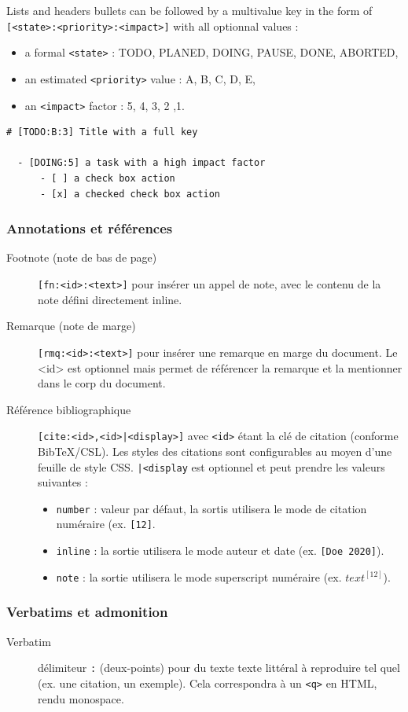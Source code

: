 \documentclass[a4paper,12pt]{article}
\newcounter{rmq}
\begin{document}
Lists and headers bullets can be followed by a multivalue key in the form of \texttt{[<state>:<priority>:<impact>]} with all optionnal values :
\begin{itemize}
\item a formal \texttt{<state>} : TODO, PLANED, DOING, PAUSE, DONE, ABORTED,
\item an estimated \texttt{<priority>} value : A, B, C, D, E,
\item an \texttt{<impact>} factor : 5, 4, 3, 2 ,1.
\end{itemize}

\begin{verbatim}
# [TODO:B:3] Title with a full key

  - [DOING:5] a task with a high impact factor
      - [ ] a check box action
      - [x] a checked check box action
\end{verbatim}
\subsubsection{Annotations et références}
\label{sec:org92d2055}
\begin{description}
\item[{Footnote (note de bas de page)}] \texttt{[fn:<id>:<text>]} pour insérer un appel de note, avec le contenu de la note défini directement inline.
\item[{Remarque (note de marge)}] \texttt{[rmq:<id>:<text>]} pour insérer une remarque en marge du document. Le <id> est optionnel mais permet de référencer la remarque et la mentionner dans le corp du document.
\item[{Référence bibliographique}] \texttt{[cite:<id>,<id>|<display>]} avec \texttt{<id>} étant la clé de citation (conforme BibTeX/CSL). Les styles des citations sont configurables au moyen d'une feuille de style CSS. \texttt{|<display} est optionnel et peut prendre les valeurs suivantes :
\begin{itemize}
\item \texttt{number} : valeur par défaut, la sortis utilisera le mode de citation numéraire (ex. \texttt{[12]}.
\item \texttt{inline} : la sortie utilisera le mode auteur et date (ex. \texttt{[Doe 2020]}).
\item \texttt{note} : la sortie utilisera le mode superscript numéraire (ex. \(text^{[12]}\)).
\end{itemize}
\end{description}
\subsubsection{Verbatims et admonition}
\label{sec:org5d0b65d}
\begin{description}
\item[{Verbatim}] délimiteur \texttt{:} (deux-points) pour du texte texte littéral à reproduire tel quel (ex. une citation, un exemple). Cela correspondra à un \texttt{<q>} en HTML, rendu monospace.
\end{description}
\end{document}
